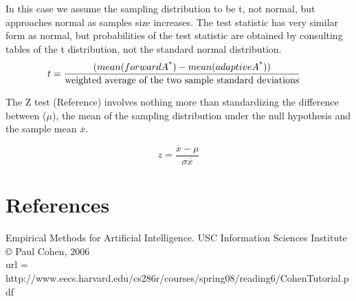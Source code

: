 \documentclass[12pt]{article}
\begin{document}
In this case we assume the sampling distribution to be t, not normal, but approaches normal as samples size increases. The test statistic has very similar form as normal, but probabilities of the test statistic are obtained by consulting tables of the t distribution, not the standard normal distribution.
  \hspace {4em}
  \begin{align*}
  	t&=\frac{(mean(forward A\textsuperscript{*}) - mean(adaptive A\textsuperscript{*}))}{\text{weighted  average of the two sample standard deviations}}
  \end{align*}

The Z test (Reference) involves nothing more than standardizing the difference between ($\mu$), the mean of the sampling distribution under the null hypothesis and the sample mean $\overline{x}$.

\[z = \frac{\overline{x} - \mu}{\sigma\overline{x}}\]

\newpage
 

\section*{References}
 Empirical Methods for Artificial Intelligence. 
USC Information Sciences Institute
© Paul Cohen, 2006
\\
 url = {http://www.eecs.harvard.edu/cs286r/courses/spring08/reading6/CohenTutorial.pdf}
\end{document}
